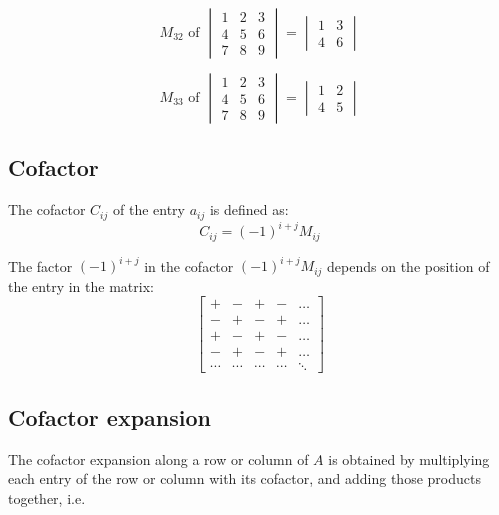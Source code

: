 \documentclass[11pt]{article}
\begin{document}
\begin{displaymath}
M_{32} \text{ of }
\begin{vmatrix}
1 & 2 & 3 \\
4 & 5 & 6 \\
7 & 8 & 9
\end{vmatrix} = \begin{vmatrix}
1 & 3 \\
4 & 6
\end{vmatrix}
\end{displaymath}

\begin{displaymath}
M_{33} \text{ of }
\begin{vmatrix}
1 & 2 & 3 \\
4 & 5 & 6 \\
7 & 8 & 9
\end{vmatrix} = \begin{vmatrix}
1 & 2 \\
4 & 5
\end{vmatrix}
\end{displaymath}

 \newpage

\subsection{Cofactor}
\label{sec:org21e6872}
The cofactor \(C_{ij}\) of the entry \(a_{ij}\) is defined as:
\[C_{ij} = (-1)^{i + j} M_{ij}\]

The factor \((-1)^{i + j}\) in the cofactor \((-1)^{i + j} M_{ij}\) depends on the position
of the entry in the matrix:
\begin{displaymath}
\begin{bmatrix}
+ & - & + & - & \ldots \\
- & + & - & + & \ldots \\
+ & - & + & - & \ldots \\
- & + & - & + & \ldots \\
\cdots & \cdots & \cdots & \cdots & \ddots
\end{bmatrix}
\end{displaymath}

\subsection{Cofactor expansion}
\label{sec:org1aeef1f}
The cofactor expansion along a row or column of \(A\) is obtained by multiplying each entry of the row or column with its cofactor, and adding those products together, i.e.
\\[0pt]
\end{document}
